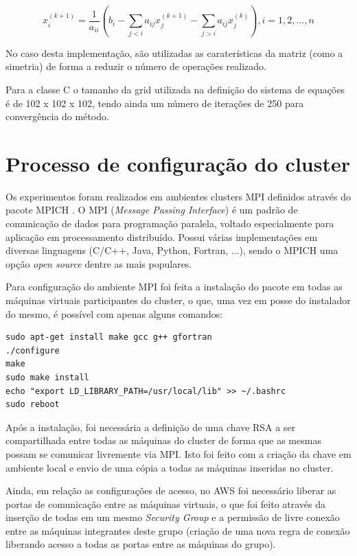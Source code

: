 \documentclass[a4paper,11pt]{article}
\begin{document}
$$x^{(k+1)}_i= \frac{1}{a_{ii}} \left( b_i - \sum_{j<i}a_{ij}x_j^{(k+1)} - \sum_{j>i}a_{ij}x_j^{(k)}\right), i=1,2,\dots,n$$

No caso desta implementação, são utilizadas as caraterísticas da matriz (como a simetria) de forma a reduzir o número de operações realizado. 

Para a classe C o tamanho da grid utilizada na definição do sistema de equações é de 102 x 102 x 102, tendo ainda um número de iterações de 250 para convergência do método. %


\vspace{0.3cm}

\section{Processo de configuração do cluster}
\vspace{0.3cm}

Os experimentos foram realizados em ambientes clusters MPI definidos através do pacote MPICH \cite{MPI}. O MPI (\textit{Message Passing Interface}) é um padrão de comunicação de dados para programação paralela, voltado especialmente para aplicação em processamento distribuído. Possui várias implementações em diversas linguagens (C/C++, Java, Python, Fortran, $\dots$), sendo o MPICH uma opção \textit{open source} dentre as mais populares.


Para configuração do ambiente MPI foi feita a instalação do pacote em todas as máquinas virtuais participantes do cluster, o que, uma vez em posse do instalador do mesmo, é possível com apenas alguns comandos:

\begin{verbatim}
sudo apt-get install make gcc g++ gfortran  
./configure
make
sudo make install
echo "export LD_LIBRARY_PATH=/usr/local/lib" >> ~/.bashrc
sudo reboot
\end{verbatim}

Após a instalação, foi necessária a definição de uma chave RSA a ser compartilhada entre todas as máquinas do cluster de forma que as mesmas possam se comunicar livremente via MPI. Isto foi feito com a criação da chave em ambiente local e envio de uma cópia a todas as máquinas inseridas no cluster.

Ainda, em relação as configurações de acesso, no AWS foi necessário liberar as portas de comunicação entre as máquinas virtuais, o que foi feito através da inserção de todas em um mesmo \textit{Security Group} e a permissão de livre conexão entre as máquinas integrantes deste grupo (criação de uma nova regra de conexão liberando acesso a todas as portas entre as máquinas do grupo).
\end{document}
